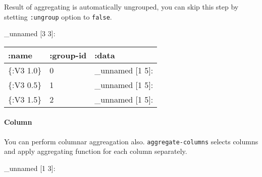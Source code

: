 \documentclass[]{article}
\newenvironment{Shaded}{\begin{snugshade}}{\end{snugshade}}
\newcommand{\KeywordTok}[1]{\textcolor[rgb]{0.13,0.29,0.53}{\textbf{#1}}}
\newcommand{\DecValTok}[1]{\textcolor[rgb]{0.00,0.00,0.81}{#1}}
\newcommand{\StringTok}[1]{\textcolor[rgb]{0.31,0.60,0.02}{#1}}
\newcommand{\VariableTok}[1]{\textcolor[rgb]{0.00,0.00,0.00}{#1}}
\newcommand{\AttributeTok}[1]{\textcolor[rgb]{0.77,0.63,0.00}{#1}}
\newcommand{\NormalTok}[1]{#1}
\let\oldparagraph\paragraph
\renewcommand{\paragraph}[1]{\oldparagraph{#1}\mbox{}}
\begin{document}
Result of aggregating is automatically ungrouped, you can skip this step
by stetting \texttt{:ungroup} option to \texttt{false}.

\begin{Shaded}
\end{Shaded}

\_unnamed {[}3 3{]}:

\begin{longtable}[]{@{}lll@{}}
\toprule
:name & :group-id & :data\tabularnewline
\midrule
\endhead
\{:V3 1.0\} & 0 & \_unnamed {[}1 5{]}:\tabularnewline
\{:V3 0.5\} & 1 & \_unnamed {[}1 5{]}:\tabularnewline
\{:V3 1.5\} & 2 & \_unnamed {[}1 5{]}:\tabularnewline
\bottomrule
\end{longtable}

\paragraph{Column}\label{column}

You can perform columnar aggreagation also. \texttt{aggregate-columns}
selects columns and apply aggregating function for each column
separately.

\begin{Shaded}
\end{Shaded}

\_unnamed {[}1 3{]}:
\end{document}
